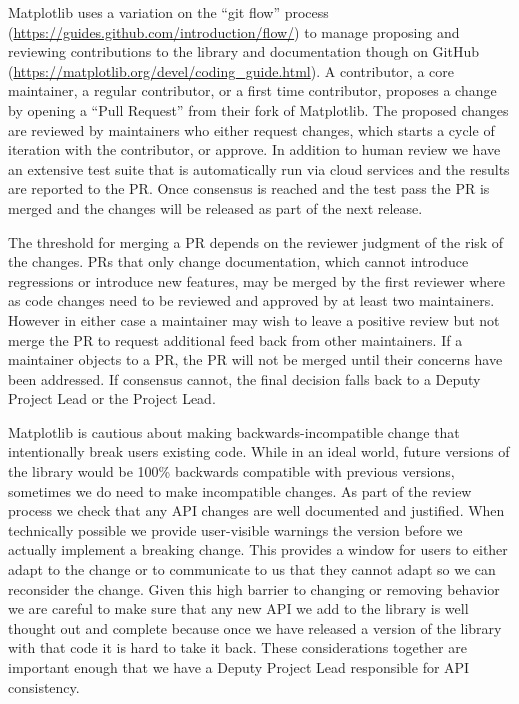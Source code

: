 \documentclass[12pt]{article}
\numberwithin{page}{section}
\begin{document}
Matplotlib uses a variation on the ``git flow'' process
(\url{https://guides.github.com/introduction/flow/}) to manage
proposing and reviewing contributions to the library and documentation
though on GitHub
(\url{https://matplotlib.org/devel/coding_guide.html}).  A
contributor, a core maintainer, a regular contributor, or a first time
contributor, proposes a change by opening a ``Pull Request'' from
their fork of Matplotlib.  The proposed changes are reviewed by
maintainers who either request changes, which starts a cycle of
iteration with the contributor, or approve.  In addition to human
review we have an extensive test suite that is automatically run via
cloud services and the results are reported to the PR.  Once consensus
is reached and the test pass the PR is merged and the changes will be
released as part of the next release.

The threshold for merging a PR depends on the reviewer judgment of the
risk of the changes.  PRs that only change documentation, which cannot
introduce regressions or introduce new features, may be merged by the
first reviewer where as code changes need to be reviewed and approved
by at least two maintainers.  However in either case a maintainer may
wish to leave a positive review but not merge the PR to request
additional feed back from other maintainers.  If a maintainer objects
to a PR, the PR will not be merged until their concerns have been
addressed.  If consensus cannot, the final decision falls back to a
Deputy Project Lead or the Project Lead.

Matplotlib is cautious about making backwards-incompatible change that
intentionally break users existing code.  While in an ideal world,
future versions of the library would be 100\% backwards compatible
with previous versions, sometimes we do need to make incompatible
changes.  As part of the review process we check that any API changes
are well documented and justified.  When technically possible we
provide user-visible warnings the version before we actually implement
a breaking change.  This provides a window for users to either adapt
to the change or to communicate to us that they cannot adapt so we
can reconsider the change.  Given this high barrier to changing or
removing behavior we are careful to make sure that any new API we add
to the library is well thought out and complete because once we have
released a version of the library with that code it is hard to take it
back.  These considerations together are important enough that we have
a Deputy Project Lead responsible for API consistency.
\end{document}
